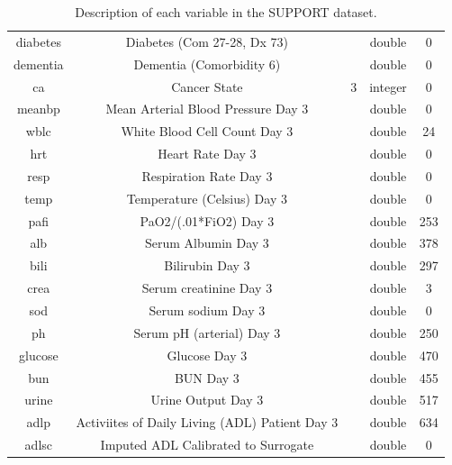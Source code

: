 \documentclass[
]{jss}
\begin{document}
\begin{table}[ht]
\begin{tabular}{ccccc}
diabetes      & Diabetes (Com 27-28, Dx 73)              &                 & double           & 0            \\
dementia      & Dementia (Comorbidity 6)                 &                 & double           & 0            \\
ca              & Cancer State                             & 3               & integer          & 0            \\
meanbp        & Mean Arterial Blood Pressure Day 3       &                 & double           & 0            \\
wblc          & White Blood Cell Count Day 3             &                 & double           & 24           \\
hrt           & Heart Rate Day 3                         &                 & double           & 0            \\
resp          & Respiration Rate Day 3                   &                 & double           & 0            \\
temp          & Temperature (Celsius) Day 3              &                 & double           & 0            \\
pafi          & PaO2/(.01*FiO2) Day 3                    &                 & double           & 253          \\
alb           & Serum Albumin Day 3                      &                 & double           & 378          \\
bili          & Bilirubin Day 3                          &                 & double           & 297          \\
crea          & Serum creatinine Day 3                   &                 & double           & 3            \\
sod           & Serum sodium Day 3                       &                 & double           & 0            \\
ph            & Serum pH (arterial) Day 3                &                 & double           & 250          \\
glucose       & Glucose Day 3                            &                 & double           & 470          \\
bun           & BUN Day 3                                &                 & double           & 455          \\
urine         & Urine Output Day 3                       &                 & double           & 517          \\
adlp          & Activiites of Daily Living (ADL) Patient Day 3 &           & double           & 634          \\
adlsc         & Imputed ADL Calibrated to Surrogate      &                 & double           & 0           
\end{tabular}
\caption{Description of each variable in the SUPPORT dataset.}
\label{tab:support1}
\end{table}
\end{document}

